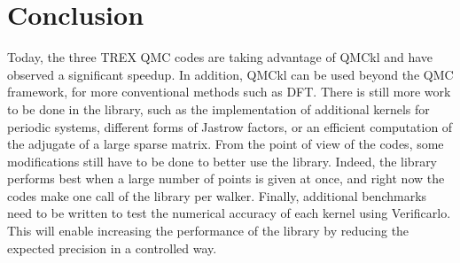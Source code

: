 \section{Conclusion}

Today, the three TREX QMC codes are taking advantage of QMCkl and have
observed a significant speedup. In addition, QMCkl can be used beyond the QMC framework,
for more conventional methods such as \ac{DFT}. There is still more work to be
done in the library, such as the implementation of additional kernels for
periodic systems, different forms of Jastrow factors, or an efficient computation of the
adjugate of a large sparse matrix.
From the point of view of the codes, some modifications still have to be done to better use
the library. Indeed, the library performs best when a large number of points is given at once, and right now the codes make one call of the library per walker.
Finally, additional benchmarks need to be written to test the numerical accuracy of each kernel using Verificarlo.
This will enable increasing the performance of the library by reducing the expected precision in a controlled way.
